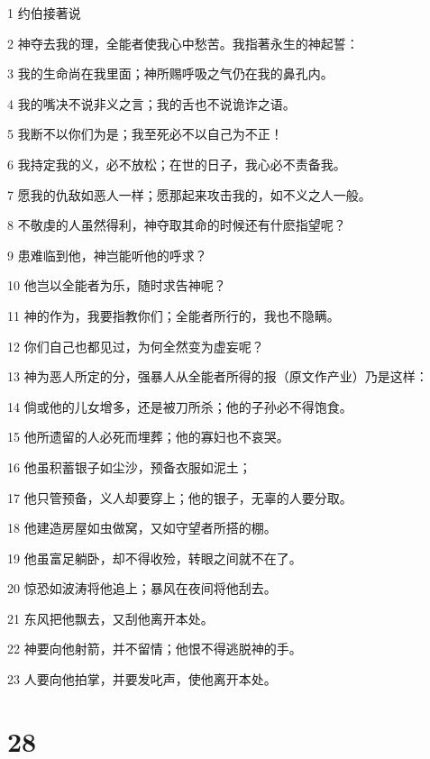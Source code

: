 \par 1 约伯接著说
\par 2 神夺去我的理，全能者使我心中愁苦。我指著永生的神起誓：
\par 3 我的生命尚在我里面；神所赐呼吸之气仍在我的鼻孔内。
\par 4 我的嘴决不说非义之言；我的舌也不说诡诈之语。
\par 5 我断不以你们为是；我至死必不以自己为不正！
\par 6 我持定我的义，必不放松；在世的日子，我心必不责备我。
\par 7 愿我的仇敌如恶人一样；愿那起来攻击我的，如不义之人一般。
\par 8 不敬虔的人虽然得利，神夺取其命的时候还有什麽指望呢？
\par 9 患难临到他，神岂能听他的呼求？
\par 10 他岂以全能者为乐，随时求告神呢？
\par 11 神的作为，我要指教你们；全能者所行的，我也不隐瞒。
\par 12 你们自己也都见过，为何全然变为虚妄呢？
\par 13 神为恶人所定的分，强暴人从全能者所得的报（原文作产业）乃是这样：
\par 14 倘或他的儿女增多，还是被刀所杀；他的子孙必不得饱食。
\par 15 他所遗留的人必死而埋葬；他的寡妇也不哀哭。
\par 16 他虽积蓄银子如尘沙，预备衣服如泥土；
\par 17 他只管预备，义人却要穿上；他的银子，无辜的人要分取。
\par 18 他建造房屋如虫做窝，又如守望者所搭的棚。
\par 19 他虽富足躺卧，却不得收殓，转眼之间就不在了。
\par 20 惊恐如波涛将他追上；暴风在夜间将他刮去。
\par 21 东风把他飘去，又刮他离开本处。
\par 22 神要向他射箭，并不留情；他恨不得逃脱神的手。
\par 23 人要向他拍掌，并要发叱声，使他离开本处。

\chapter{28}

